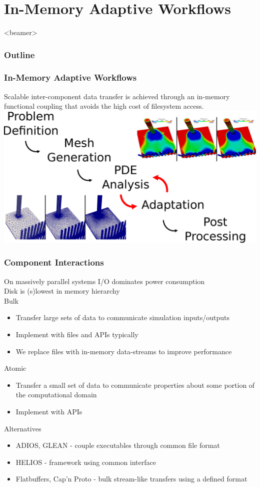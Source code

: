 \documentclass{beamer}
\newcommand{\outline}{
  \begin{frame}<beamer>
    \frametitle{Outline}
    \tableofcontents[currentsection]
  \end{frame}
}
\begin{document}
\section{In-Memory Adaptive Workflows}
\outline

\begin{frame}
  \frametitle{In-Memory Adaptive Workflows}
  Scalable inter-component data transfer is achieved through an in-memory
  functional coupling that avoids the high cost of filesystem access.\\
  \bigskip
  \centering
  \includegraphics[width=.8\textwidth]{figs/SimulationBasedEngineeringWorkflow2.eps}
\end{frame}

\begin{frame}
  \frametitle{Component Interactions}
  On massively parallel systems I/O dominates power consumption\\
  \smallskip
  Disk is (s)lowest in memory hierarchy\\
  \smallskip
  Bulk
  \begin{itemize}
    \item Transfer large sets of data to communicate simulation inputs/outputs
    \item Implement with files and APIs typically
    \item We replace files with in-memory data-streams to improve performance
  \end{itemize}
  Atomic
  \begin{itemize}
    \item Transfer a small set of data to communicate properties about some
      portion of the computational domain
    \item Implement with APIs
  \end{itemize}
  Alternatives
  \begin{itemize}
    \item ADIOS, GLEAN - couple executables through common file format
    \item HELIOS - framework using common interface
    \item Flatbuffers, Cap'n Proto - bulk stream-like transfers using a defined
      format
  \end{itemize}
\end{frame}
\end{document}
